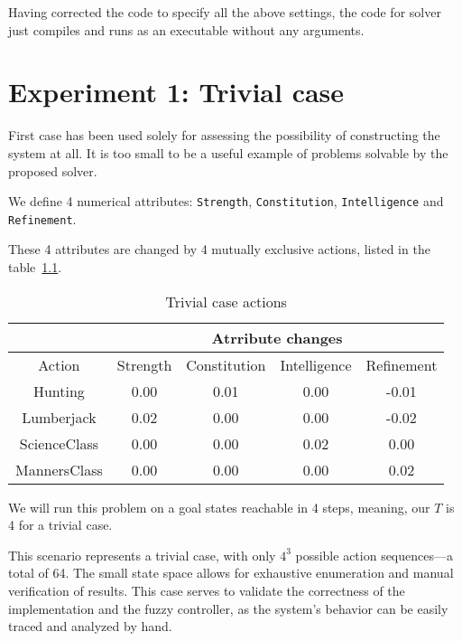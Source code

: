 \documentclass[12pt, a4paper]{report}
\begin{document}
	Having corrected the code to specify all the above settings, the code for solver just compiles and runs as an executable without any arguments.
	
	\chapter{Experiment 1: Trivial case}\label{trivial-case}

	First case has been used solely for assessing the possibility of constructing the system at all.
	It is too small to be a useful example of problems solvable by the proposed solver.
	
	We define 4 numerical attributes: \texttt{Strength}, \texttt{Constitution}, \texttt{Intelligence} and \texttt{Refinement}.
	
	These 4 attributes are changed by 4 mutually exclusive actions, listed in the table~\ref{table::trivial-case-actions}.
	
\begin{table}[h!]
	\centering
	\caption{Trivial case actions}
	\label{table::trivial-case-actions}
	\begin{tabular}{|c|c|c|c|c|}
		\hline
		              &   \multicolumn{4}{|c|}{Atrribute changes}               \\ \hline
		Action        & Strength & Constitution &  Intelligence  & Refinement   \\ \hline
		Hunting       & 0.00     & 0.01         &  0.00          & -0.01        \\ \hline
		Lumberjack    & 0.02     & 0.00         &  0.00          & -0.02        \\ \hline
		ScienceClass  & 0.00     & 0.00         &  0.02          &  0.00        \\ \hline
		MannersClass  & 0.00     & 0.00         &  0.00          &  0.02        \\ \hline
	\end{tabular}
\end{table}

	We will run this problem on a goal states reachable in 4 steps, meaning, our $T$ is 4 for a trivial case.

	This scenario represents a trivial case, with only $4^{3}$ possible action sequences—a total of 64.
	The small state space allows for exhaustive enumeration and manual verification of results.
	This case serves to validate the correctness of the implementation and the fuzzy controller, as the system's behavior can be easily traced and analyzed by hand.
\end{document}
